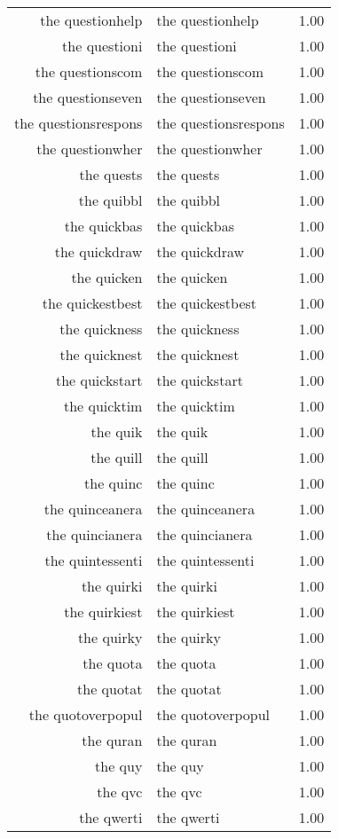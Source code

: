 \begin{table}[ht]
\begin{tabular}{rlr}
  the questionhelp & the questionhelp & 1.00 \\ 
  the questioni & the questioni & 1.00 \\ 
  the questionscom & the questionscom & 1.00 \\ 
  the questionseven & the questionseven & 1.00 \\ 
  the questionsrespons & the questionsrespons & 1.00 \\ 
  the questionwher & the questionwher & 1.00 \\ 
  the quests & the quests & 1.00 \\ 
  the quibbl & the quibbl & 1.00 \\ 
  the quickbas & the quickbas & 1.00 \\ 
  the quickdraw & the quickdraw & 1.00 \\ 
  the quicken & the quicken & 1.00 \\ 
  the quickestbest & the quickestbest & 1.00 \\ 
  the quickness & the quickness & 1.00 \\ 
  the quicknest & the quicknest & 1.00 \\ 
  the quickstart & the quickstart & 1.00 \\ 
  the quicktim & the quicktim & 1.00 \\ 
  the quik & the quik & 1.00 \\ 
  the quill & the quill & 1.00 \\ 
  the quinc & the quinc & 1.00 \\ 
  the quinceanera & the quinceanera & 1.00 \\ 
  the quincianera & the quincianera & 1.00 \\ 
  the quintessenti & the quintessenti & 1.00 \\ 
  the quirki & the quirki & 1.00 \\ 
  the quirkiest & the quirkiest & 1.00 \\ 
  the quirky & the quirky & 1.00 \\ 
  the quota & the quota & 1.00 \\ 
  the quotat & the quotat & 1.00 \\ 
  the quotoverpopul & the quotoverpopul & 1.00 \\ 
  the quran & the quran & 1.00 \\ 
  the quy & the quy & 1.00 \\ 
  the qvc & the qvc & 1.00 \\ 
  the qwerti & the qwerti & 1.00 \\ 

\end{tabular}
\end{table}
